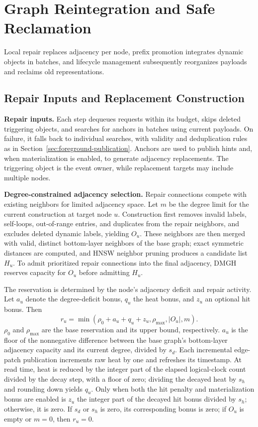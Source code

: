 \documentclass[sigconf,pbalance]{acmart}
\begin{document}
\section{Graph Reintegration and Safe Reclamation}
\label{sec:repair-lifecycle}

Local repair replaces adjacency per node, prefix promotion integrates dynamic objects in batches, and lifecycle management subsequently reorganizes payloads and reclaims old representations.

\subsection{Repair Inputs and Replacement Construction}
\label{sec:repair-obligation}

\textbf{Repair inputs.} Each step dequeues requests within its budget, skips deleted triggering objects, and searches for anchors in batches using current payloads. On failure, it falls back to individual searches, with validity and deduplication rules as in Section~\ref{sec:foreground-publication}. Anchors are used to publish hints and, when materialization is enabled, to generate adjacency replacements. The triggering object is the event owner, while replacement targets may include multiple nodes.

\textbf{Degree-constrained adjacency selection.} Repair connections compete with existing neighbors for limited adjacency space. Let $m$ be the degree limit for the current construction at target node $u$. Construction first removes invalid labels, self-loops, out-of-range entries, and duplicates from the repair neighbors, and excludes deleted dynamic labels, yielding $O_u$. These neighbors are then merged with valid, distinct bottom-layer neighbors of the base graph; exact symmetric distances are computed, and HNSW neighbor pruning produces a candidate list $H_u$. To admit prioritized repair connections into the final adjacency, DMGH reserves capacity for $O_u$ before admitting $H_u$.

The reservation is determined by the node's adjacency deficit and repair activity. Let $a_u$ denote the degree-deficit bonus, $q_u$ the heat bonus, and $z_u$ an optional hit bonus. Then
\begin{equation}
\label{eq:repair-reserve}
r_u=\min\!\left(\rho_0+a_u+q_u+z_u,\rho_{\max},|O_u|,m\right).
\end{equation}
$\rho_0$ and $\rho_{\max}$ are the base reservation and its upper bound, respectively. $a_u$ is the floor of the nonnegative difference between the base graph's bottom-layer adjacency capacity and its current degree, divided by $s_d$. Each incremental edge-patch publication increments raw heat by one and refreshes its timestamp. At read time, heat is reduced by the integer part of the elapsed logical-clock count divided by the decay step, with a floor of zero; dividing the decayed heat by $s_h$ and rounding down yields $q_u$. Only when both the hit penalty and materialization bonus are enabled is $z_u$ the integer part of the decayed hit bonus divided by $s_h$; otherwise, it is zero. If $s_d$ or $s_h$ is zero, its corresponding bonus is zero; if $O_u$ is empty or $m=0$, then $r_u=0$.
\end{document}
